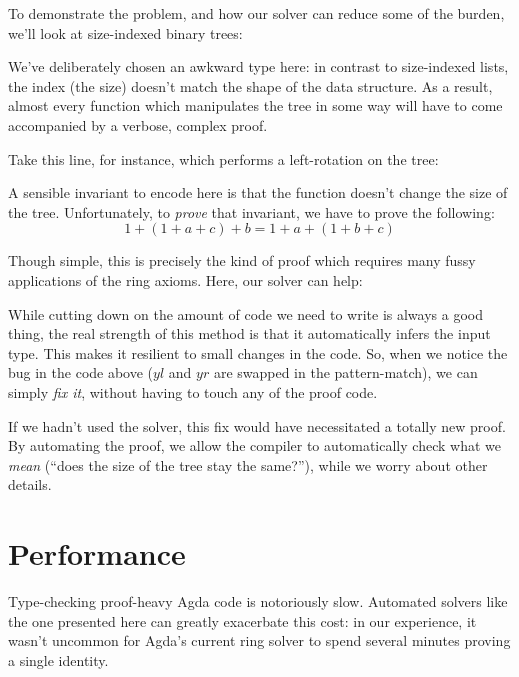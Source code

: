 \documentclass[acmsmall,review,anonymous]{acmart}\settopmatter{printfolios=true,printccs=false,printacmref=false}
\theoremstyle{remark}
\begin{document}
To demonstrate the problem, and how our solver can reduce some of the burden,
we'll look at size-indexed binary trees:
\begin{center}
\end{center}
We've deliberately chosen an awkward type here: in contrast to size-indexed
lists, the index (the size) doesn't match the shape of the data structure. As a
result, almost every function which manipulates the tree in some way will have
to come accompanied by a verbose, complex proof.

Take this line, for instance, which performs a left-rotation on the tree:
\begin{center}
\end{center}

A sensible invariant to encode here is that the function doesn't change the size
of the tree. Unfortunately, to \emph{prove} that invariant, we have to prove the
following:
\[1 + (1 + a + c) + b = 1 + a + (1 + b + c)\]

Though simple, this is precisely the kind of proof which requires many fussy
applications of the ring axioms. Here, our solver can help:
\begin{center}
\end{center}

While cutting down on the amount of code we need to write is always a good
thing, the real strength of this method is that it automatically infers the
input type. This makes it resilient to small changes in the code. So, when we
notice the bug in the code above (\(yl\) and \(yr\) are swapped in the
pattern-match), we can simply \emph{fix it}, without having to touch any of the
proof code.
\begin{center}
\end{center}

If we hadn't used the solver, this fix would have necessitated a totally new
proof. By automating the proof, we allow the compiler to automatically check
what we \emph{mean} (``does the size of the tree stay the same?''), while we
worry about other details.
\section{Performance} \label{performance}
Type-checking proof-heavy Agda code is notoriously slow. Automated solvers like
the one presented here can greatly exacerbate this cost: in our experience, it
wasn't uncommon for Agda's current ring solver to spend several minutes proving
a single identity.
\end{document}
